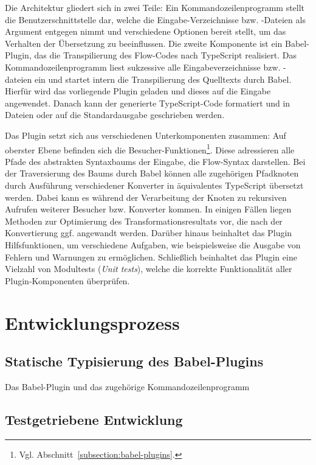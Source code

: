 Die Architektur gliedert sich in zwei Teile: Ein Kommandozeilenprogramm stellt die Benutzerschnittstelle dar, welche die Eingabe-Verzeichnisse bzw. -Dateien als Argument entgegen nimmt und verschiedene Optionen bereit stellt, um das Verhalten der Übersetzung zu beeinflussen. Die zweite Komponente ist ein Babel-Plugin, das die Transpilierung des Flow-Codes nach TypeScript realisiert. Das Kommandozeilenprogramm liest sukzessive alle Eingabeverzeichnisse bzw. -dateien ein und startet intern die Transpilierung des Quelltexts durch Babel. Hierfür wird das vorliegende Plugin geladen und dieses auf die Eingabe angewendet. Danach kann der generierte TypeScript-Code formatiert und in Dateien oder auf die Standardausgabe geschrieben werden.

Das Plugin setzt sich aus verschiedenen Unterkomponenten zusammen: Auf oberster Ebene befinden sich die Besucher-Funktionen\footnote{Vgl. Abschnitt~\ref{subsection:babel-plugins}.}. Diese adressieren alle Pfade des abstrakten Syntaxbaums der Eingabe, die Flow-Syntax darstellen. Bei der Traversierung des Baums durch Babel können alle zugehörigen Pfadknoten durch Ausführung verschiedener Konverter in äquivalentes TypeScript übersetzt werden. Dabei kann es während der Verarbeitung der Knoten zu rekursiven Aufrufen weiterer Besucher bzw. Konverter kommen. In einigen Fällen liegen Methoden zur Optimierung des Transformationsresultats vor, die nach der Konvertierung ggf. angewandt werden. Darüber hinaus beinhaltet das Plugin Hilfsfunktionen, um verschiedene Aufgaben, wie beispielsweise die Ausgabe von Fehlern und Warnungen zu ermöglichen. Schließlich beinhaltet das Plugin eine Vielzahl von Modultests (\textit{Unit tests}), welche die korrekte Funktionalität aller Plugin-Komponenten überprüfen.

\section{Entwicklungsprozess}

\subsection{Statische Typisierung des Babel-Plugins}

Das Babel-Plugin und das zugehörige Kommandozeilenprogramm

\subsection{Testgetriebene Entwicklung}

